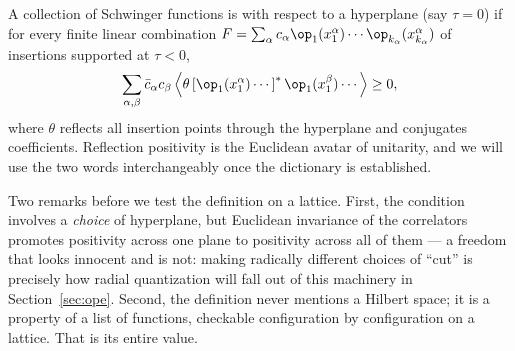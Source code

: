 \begin{ddefinition}
\label{def:reflection-positivity}
A collection of Schwinger functions is  with respect
to a hyperplane (say $\tau = 0$) if for every finite linear combination $F =
\sum_\alpha c_\alpha \op_{1}(x^\alpha_1)\cdots\op_{k_\alpha}(x^\alpha_{k_\alpha})$
of insertions supported at $\tau < 0$,
\begin{equation}
\sum_{\alpha,\beta} \bar c_\alpha c_\beta
\left\langle \theta\left[\op_{1}(x^\alpha_1)\cdots\right]^{*}
\op_{1}(x^\beta_1)\cdots \right\rangle \ge 0,
\label{eq:rp-def}
\end{equation}
where $\theta$ reflects all insertion points through the hyperplane and
conjugates coefficients. Reflection positivity is the Euclidean avatar of
unitarity, and we will use the two words interchangeably once the dictionary is
established.
\end{ddefinition}

\noin Two remarks before we test the definition on a lattice. First, the
condition involves a \emph{choice} of hyperplane, but Euclidean invariance of
the correlators promotes positivity across one plane to positivity across all
of them --- a freedom that looks innocent and is not: making radically
different choices of ``cut'' is precisely how radial quantization will fall out
of this machinery in Section~\ref{sec:ope}. Second, the definition never
mentions a Hilbert space; it is a property of a list of functions, checkable
configuration by configuration on a lattice. That is its entire value.

